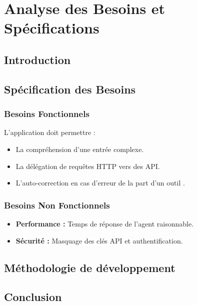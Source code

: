 \chapter{Analyse des Besoins et Spécifications}
\section{Introduction}

\section{Spécification des Besoins}
\subsection{Besoins Fonctionnels}
L'application doit permettre :
\begin{itemize}
    \item La compréhension d'une entrée complexe.
    \item La délégation de requêtes HTTP vers des API.
    \item L'auto-correction en cas d'erreur de la part d'un outil \cite{smith2023agents}.
\end{itemize}

\subsection{Besoins Non Fonctionnels}
\begin{itemize}
    \item \textbf{Performance :} Temps de réponse de l'agent raisonnable.
    \item \textbf{Sécurité :} Masquage des clés API et authentification.
\end{itemize}

\section{Méthodologie de développement}

\section{Conclusion}
